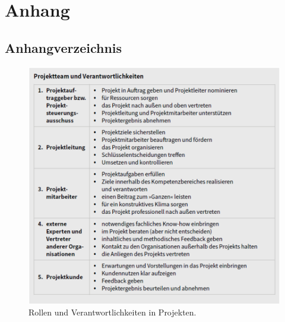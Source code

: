 \chapter*{Anhang}
\section*{Anhangverzeichnis}
\vspace{-8em}

\abstaendeanhangverzeichnis

\listofanhang
\clearpage
{} %

\label{anhang:kap1}
\begin{figure}[H]
  \centering
  \includegraphics[width=0.8\linewidth]{graphics/pr_ve.png}
  \caption[Rollen und Verantwortlichkeiten in Projekten.]{Rollen und Verantwortlichkeiten in Projekten.\protect\footnotemark}\label{abb:pr_ve}
\end{figure}
\label{anhang:kap2}
